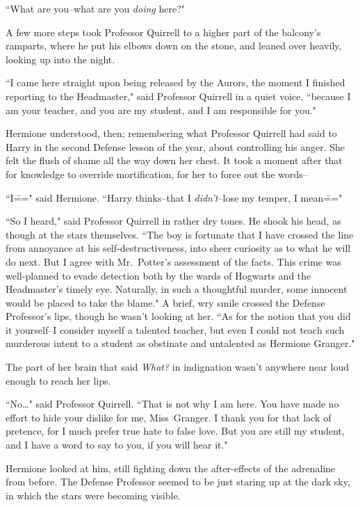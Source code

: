 ``What are you\---what are you \emph{doing} here?"

A few more steps took Professor Quirrell to a higher part of the balcony's ramparts, where he put his elbows down on the stone, and leaned over heavily, looking up into the night.

``I came here straight upon being released by the Aurors, the moment I finished reporting to the Headmaster," said Professor Quirrell in a quiet voice, ``because I am your teacher, and you are my student, and I am responsible for you."

Hermione understood, then; remembering what Professor Quirrell had said to Harry in the second Defense lesson of the year, about controlling his anger. She felt the flush of shame all the way down her chest. It took a moment after that for knowledge to override mortification, for her to force out the words\---

``I\===" said Hermione. ``Harry thinks\---that I \emph{didn't}\---lose my temper, I mean\==="

``So I heard," said Professor Quirrell in rather dry tones. He shook his head, as though at the stars themselves. ``The boy is fortunate that I have crossed the line from annoyance at his self-destructiveness, into sheer curiosity as to what he will do next. But I agree with Mr.~Potter's assessment of the facts. This crime was well-planned to evade detection both by the wards of Hogwarts and the Headmaster's timely eye. Naturally, in such a thoughtful murder, some innocent would be placed to take the blame." A brief, wry smile crossed the Defense Professor's lips, though he wasn't looking at her. ``As for the notion that you did it yourself\---I consider myself a talented teacher, but even I could not teach such murderous intent to a student as obstinate and untalented as Hermione Granger."

The part of her brain that said \emph{What?} in indignation wasn't anywhere near loud enough to reach her lips.

``No{\ldots}" said Professor Quirrell. ``That is not why I am here. You have made no effort to hide your dislike for me, Miss~Granger. I thank you for that lack of pretence, for I much prefer true hate to false love. But you are still my student, and I have a word to say to you, if you will hear it."

Hermione looked at him, still fighting down the after-effects of the adrenaline from before. The Defense Professor seemed to be just staring up at the dark sky, in which the stars were becoming visible.

